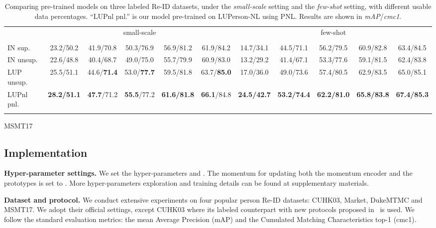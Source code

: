 \documentclass[10pt,twocolumn,letterpaper]{article}
\begin{document}
\begin{table*}[h]
    \begin{subtable}[h]{1.0\textwidth}
        \centering
        \begin{tabular}{l|ccccc|ccccc}
        \shline
        \multirow{2}{*}{pre-train} & \multicolumn{5}{c|}{small-scale} & \multicolumn{5}{c}{few-shot} \\ \cline{2-11} &  &  &  &  &  &  &  &  &  &  \\ \hline
        IN sup.    & 23.2/50.2 & 41.9/70.8 & 50.3/76.9 & 56.9/81.2 & 61.9/84.2 & 14.7/34.1 & 44.5/71.1 & 56.2/79.5 & 60.9/82.8 & 63.4/84.5 \\ 
        IN unsup.  & 22.6/48.8 & 40.4/68.7 & 49.0/75.0 & 55.7/79.9 & 60.9/83.0 & 13.2/29.2 & 41.4/67.1 & 53.3/77.6 & 59.1/81.5 & 62.4/83.8 \\
        LUP unsup. & 25.5/51.1 & 44.6/\textbf{71.4} & 53.0/\textbf{77.7} & 59.5/81.8 & 63.7/\textbf{85.0} & 17.0/36.0 & 49.0/73.6 & 57.4/80.5 & 62.9/83.5 & 65.0/85.1 \\
        \hline
        LUPnl pnl. & \textbf{28.2/51.1} & \textbf{47.7}/71.2 & \textbf{55.5}/77.2 & \textbf{61.6/81.8} & \textbf{66.1}/84.8 & \textbf{24.5/42.7} & \textbf{53.2/74.4} & \textbf{62.2/81.0} & \textbf{65.8/83.8} & \textbf{67.4/85.3} \\
        \shline
    \end{tabular}
\caption{MSMT17}
    \label{tab:sd-fw-msmt}
    \vspace{-1em}
    \end{subtable}
\caption{Comparing pre-trained models on three labeled Re-ID datasets, under the \emph{small-scale} setting and the \emph{few-shot} setting, with different usable data percentages. ``LUPnl pnl.'' is our model pre-trained on LUPerson-NL using PNL. Results are shown in  \emph{mAP}/\emph{cmc1}.}
    \label{tab:sd-fw}
    \vspace{-0.9em}
\end{table*}


\subsection{Implementation}
\noindent\textbf{Hyper-parameter settings.} We set the hyper-parameters  and . The momentum  for updating both the momentum encoder  and the prototypes is set to . More hyper-parameters exploration and training details can be found at supplementary materials. 

\noindent\textbf{Dataset and protocol.} 
We conduct extensive experiments on four popular person Re-ID datasets: CUHK03, Market, DukeMTMC and MSMT17. 
We adopt their official settings, except CUHK03 where its labeled counterpart with new protocols proposed in~\cite{zhong2017re} is used. 
We follow the standard evaluation metrics: the mean Average Precision (mAP) and the Cumulated Matching Characteristics top-1 (cmc1).
\end{document}
